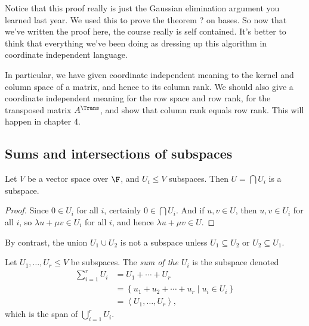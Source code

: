 \begin{remark}
	Notice that this proof really is just the Gaussian elimination argument you learned last year. We used this to prove the theorem ? on bases. So now that we've written the proof here, the course really is self contained. It's better to think that everything we've been doing as dressing up this algorithm in coordinate independent language. %

In particular, we have given coordinate independent meaning to the kernel and column space of a matrix, and hence to its column rank. We should also give a coordinate independent meaning for the row space and row rank, for the transposed matrix $A^\Trans$, and show that column rank equals row rank. This will happen in chapter 4.
\end{remark}


	\pagebreak

\subsection{Sums and intersections of subspaces} %
\label{sub:sums_and_intersections_of_subspaces}

\begin{lemma}
	Let $V$ be a vector space over $\F$, and $U_i\leq V$ subspaces. Then $U=\bigcap U_i$ is a subspace. %
\end{lemma}

\begin{proof}
	 Since $0\in U_i$ for all $i$, certainly $0\in \bigcap U_i$. And if $u,v\in U$, then $u,v\in U_i$ for all $i$, so $\lambda u+\mu v\in U_i$ for all $i$, and hence $\lambda u+\mu v\in U$. %
\end{proof}

By contrast, the union $U_1\cup U_2$ is not a subspace unless $U_1\subseteq U_2$ or $U_2\subseteq U_1$.

\begin{definition}
	Let $U_1,\ldots,U_r\leq V$ be subspaces. The \emph{sum of the $U_i$} is the subspace denoted %
	\begin{align*}
		   \sum_{i=1}^r U_i
		&= U_1 + \cdots + U_r \\[-10pt]
		&= \left\{u_1+u_2+\cdots+u_r \mid u_i \in U_i \right\} \\
		&= \left\langle U_1,\ldots,U_r \right\rangle,
	\end{align*}
	which is the span of $\bigcup_{i=1}^r U_i$.
\end{definition}

